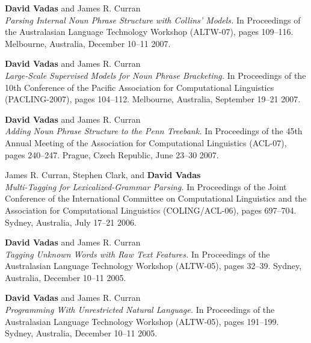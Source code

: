 \documentclass[]{article}
\begin{document}
\vbox{}

\textbf{David Vadas} and James R. Curran\\
\textit{Parsing Internal Noun Phrase Structure with Collins' Models.}
In Proceedings of the Australasian Language Technology 
Workshop (ALTW-07), pages 109--116. Melbourne, Australia, December 10--11 2007.

\vbox{}

\textbf{David Vadas} and James R. Curran\\
\textit{Large-Scale Supervised Models for Noun Phrase Bracketing.}
In Proceedings of the 10th Conference of the Pacific Association for 
Computational Linguistics (PACLING-2007), pages 104--112. 
Melbourne, Australia, September 19--21 2007.

\vbox{}

\textbf{David Vadas} and James R. Curran\\
\textit{Adding Noun Phrase Structure to the Penn Treebank.} In
Proceedings of the 45th Annual Meeting of the Association for Computational 
Linguistics (ACL-07), pages 240--247. Prague, Czech Republic, June 23--30 2007. \\
 
\vbox{}

James R. Curran, Stephen Clark, and \textbf{David Vadas}\\
\textit{Multi-Tagging for Lexicalized-Grammar Parsing.} In
Proceedings of the Joint Conference of the International Committee on
Computational Linguistics and the Association for Computational Linguistics
(COLING/ACL-06), pages 697--704. Sydney, Australia, July 17--21 2006. \\  

\vbox{}

\textbf{David Vadas} and James R. Curran\\
\textit{Tagging Unknown Words with Raw Text Features.} In Proceedings of the
Australasian Language Technology Workshop (ALTW-05), pages 32--39.
Sydney, Australia, December 10--11 2005. \\  

\vbox{}

\textbf{David Vadas} and James R. Curran\\
\textit{Programming With Unrestricted Natural Language.} In Proceedings of the
Australasian Language Technology Workshop (ALTW-05), pages 191--199. 
Sydney, Australia, December 10--11 2005. \\  
 
\end{document}
